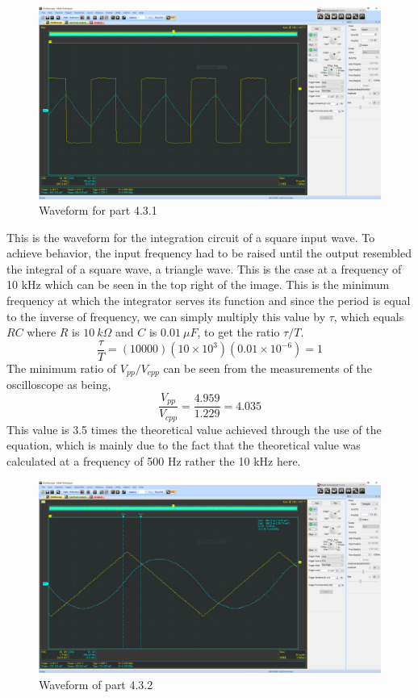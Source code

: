 \documentclass[12pt]{article}
\begin{document}
    \begin{figure}[h]
        \centering
        \includegraphics[width=\textwidth]{4.3.1.png}
        \caption{Waveform for part 4.3.1}
    \end{figure}
    \par This is the waveform for the integration circuit of a square input wave. To achieve behavior, the input frequency had to be raised until the output resembled the integral of a square wave, a triangle wave. This is the case at a frequency of 10 kHz which can be seen in the top right of the image. This is the minimum frequency at which the integrator serves its function and since the period is equal to the inverse of frequency, we can simply multiply this value by $ \tau $, which equals $ RC $ where $ R $ is $ 10\ k\Omega $ and $ C $ is $ 0.01\ \mu F $, to get the ratio $ \tau / T $.
    \[
        \frac{\tau}{T} = (10000)(10 \times 10^{3})(0.01 \times 10^{-6}) = 1
    \]
    The minimum ratio of $ V_{pp} / V_{cpp} $ can be seen from the measurements of the oscilloscope as being,
    \[
        \frac{V_{pp}}{V_{cpp}} = \frac{4.959}{1.229} = 4.035
    \]
    This value is 3.5 times the theoretical value achieved through the use of the equation, which is mainly due to the fact that the theoretical value was calculated at a frequency of 500 Hz rather the 10 kHz here.
    \newpage
    \begin{figure}[h]
        \centering
        \includegraphics[width=\textwidth]{4.3.2.png}
        \caption{Waveform of part 4.3.2}
    \end{figure}
\end{document}
